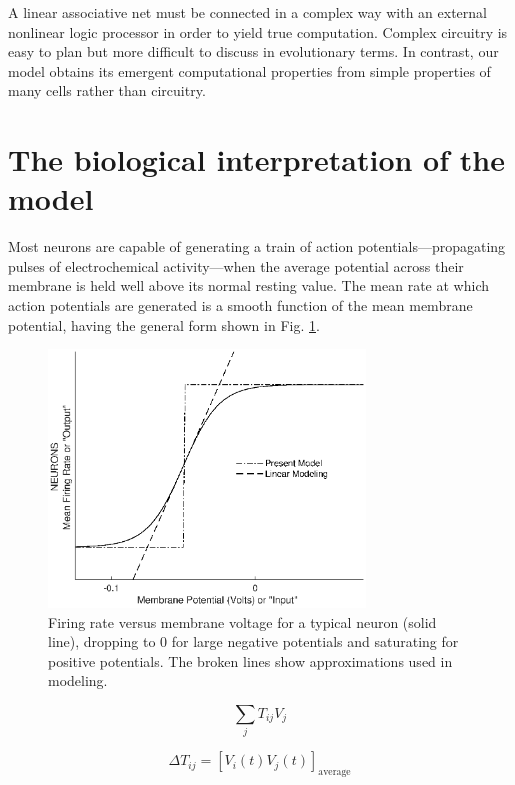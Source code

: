 \documentclass[10pt,letterpaper]{article}
\begin{document}
	A linear associative net must be connected in a complex way with an external nonlinear logic processor in order to yield true computation. Complex circuitry is easy to plan but more difficult to discuss in evolutionary terms. In contrast, our model obtains its emergent computational properties from simple properties of many cells rather than circuitry.
	
	\section{The biological interpretation of the model}
	Most neurons are capable of generating a train of action potentials---propagating pulses of electrochemical activity---when the average potential across their membrane is held well above its normal resting value. The mean rate at which action potentials are generated is a smooth function of the mean membrane potential, having the general form shown in Fig. \ref{fig:1}.
	
	\begin{figure}[h]
		\centering
		\includegraphics[width=0.75\textwidth]{Hopfield_Fig_1.eps}
		\caption{Firing rate versus membrane voltage for a typical neuron (solid line), dropping to 0 for large negative potentials and saturating for positive potentials. The broken lines show approximations used in modeling.}
		\label{fig:1}
	\end{figure}

	\begin{equation}
		\sum_{j} T_{ij}V_j
	\end{equation}
	
	\begin{equation}
		\Delta T_{ij} = [V_i(t) V_j(t)]_{\text{average}}
	\end{equation}
	
\end{document}
